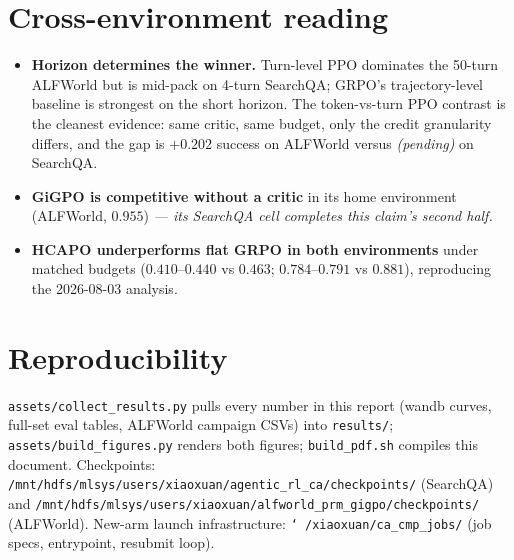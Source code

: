 \documentclass[11pt]{article}
\newcommand{\pending}[1]{\textcolor{orange!80!black}{\textit{#1}}}
\begin{document}
\section{Cross-environment reading}
\begin{itemize}
  \item \textbf{Horizon determines the winner.} Turn-level PPO dominates the 50-turn ALFWorld
        but is mid-pack on 4-turn SearchQA; GRPO's trajectory-level baseline is strongest on the
        short horizon. The token-vs-turn PPO contrast is the cleanest evidence: same critic,
        same budget, only the credit granularity differs, and the gap is $+0.202$ success on
        ALFWorld versus \pending{(pending)} on SearchQA.
  \item \textbf{GiGPO is competitive without a critic} in its home environment (ALFWorld,
        $0.955$) \pending{--- its SearchQA cell completes this claim's second half.}
  \item \textbf{HCAPO underperforms flat GRPO in both environments} under matched budgets
        ($0.410$--$0.440$ vs $0.463$; $0.784$--$0.791$ vs $0.881$), reproducing the 2026-08-03
        analysis.
\end{itemize}

\section{Reproducibility}
\texttt{assets/collect\_results.py} pulls every number in this report (wandb curves, full-set
eval tables, ALFWorld campaign CSVs) into \texttt{results/}; \texttt{assets/build\_figures.py}
renders both figures; \texttt{build\_pdf.sh} compiles this document. Checkpoints:
\texttt{/mnt/hdfs/mlsys/users/xiaoxuan/agentic\_rl\_ca/checkpoints/} (SearchQA) and
\texttt{/mnt/hdfs/mlsys/users/xiaoxuan/alfworld\_prm\_gigpo/checkpoints/} (ALFWorld). New-arm
launch infrastructure: \texttt{\char`~/xiaoxuan/ca\_cmp\_jobs/} (job specs, entrypoint,
resubmit loop).
\end{document}
